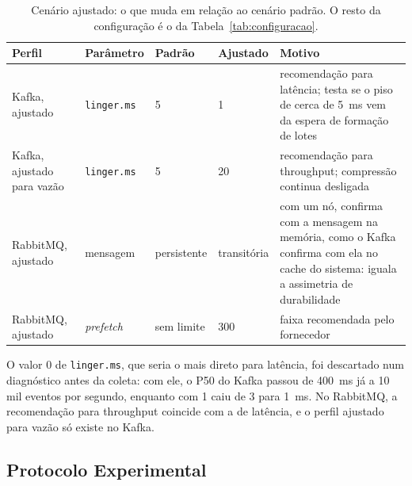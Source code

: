 \documentclass[12pt]{article}
\begin{document}
\begin{table}[ht]
\centering
\caption{Cenário ajustado: o que muda em relação ao cenário padrão. O resto da
configuração é o da Tabela~\ref{tab:configuracao}.}
\label{tab:ajustado}
\small
\begin{tabular}{|p{2.3cm}|p{2.6cm}|p{1.6cm}|p{1.6cm}|p{5.2cm}|}
\hline
\textbf{Perfil} & \textbf{Parâmetro} & \textbf{Padrão} & \textbf{Ajustado} & \textbf{Motivo} \\
\hline
Kafka, ajustado & \texttt{linger.ms} & 5 & 1 & recomendação para latência; testa se o piso de cerca de 5~ms vem da espera de formação de lotes \\
\hline
Kafka, ajustado para vazão & \texttt{linger.ms} & 5 & 20 & recomendação para throughput; compressão continua desligada \\
\hline
RabbitMQ, ajustado & mensagem & persistente & transitória & com um nó, confirma com a mensagem na memória, como o Kafka confirma com ela no cache do sistema: iguala a assimetria de durabilidade \\
\hline
RabbitMQ, ajustado & \textit{prefetch} & sem limite & 300 & faixa recomendada pelo fornecedor \\
\hline
\end{tabular}
\end{table}

O valor 0 de \texttt{linger.ms}, que seria o mais direto para latência, foi descartado
num diagnóstico antes da coleta: com ele, o P50 do Kafka passou de 400~ms já a 10 mil
eventos por segundo, enquanto com 1 caiu de 3 para 1~ms. No RabbitMQ, a recomendação
para throughput coincide com a de latência, e o perfil ajustado para vazão só existe no
Kafka.

\subsection{Protocolo Experimental}
\end{document}
